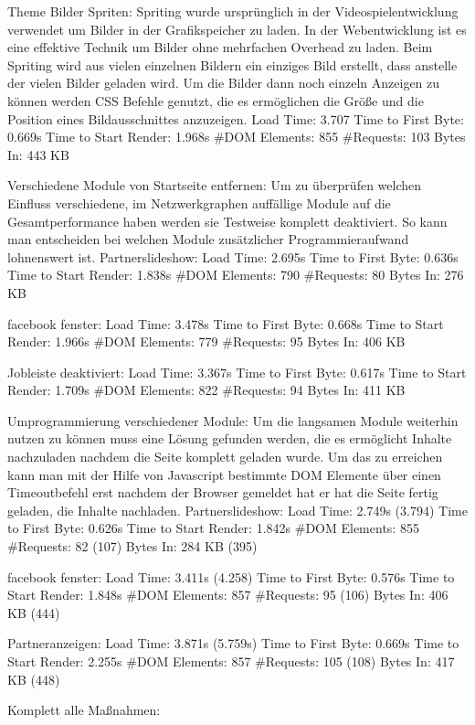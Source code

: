 Theme Bilder Spriten:
Spriting wurde ursprünglich in der Videospielentwicklung verwendet um Bilder in der Grafikspeicher zu laden. In der Webentwicklung ist es eine effektive Technik um Bilder ohne mehrfachen Overhead zu laden. Beim Spriting wird aus vielen einzelnen Bildern ein einziges Bild erstellt, dass anstelle der vielen Bilder geladen wird. Um die Bilder dann noch einzeln Anzeigen zu können werden CSS Befehle genutzt, die es ermöglichen die Größe und die Position eines Bildausschnittes anzuzeigen. 
Load Time: 3.707
Time to First Byte: 0.669s %
Time to Start Render: 1.968s
\#DOM Elements: 855 	
\#Requests: 103 
Bytes In: 443 KB 

Verschiedene Module von Startseite entfernen:
Um zu überprüfen welchen Einfluss verschiedene, im Netzwerkgraphen auffällige Module auf die Gesamtperformance haben werden sie Testweise komplett deaktiviert. So kann man entscheiden bei welchen Module zusätzlicher Programmieraufwand lohnenswert ist.
Partnerslideshow:
Load Time: 2.695s
Time to First Byte: 0.636s %
Time to Start Render: 1.838s
\#DOM Elements: 790 	
\#Requests: 80 
Bytes In: 276 KB

facebook fenster:
Load Time: 3.478s
Time to First Byte: 0.668s %
Time to Start Render: 1.966s
\#DOM Elements: 779 	
\#Requests: 95 
Bytes In: 406 KB 

Jobleiste deaktiviert:
Load Time: 3.367s
Time to First Byte: 0.617s %
Time to Start Render: 1.709s
\#DOM Elements: 822 	
\#Requests: 94 
Bytes In: 411 KB

Umprogrammierung verschiedener Module: Um die langsamen Module weiterhin nutzen zu können muss eine Lösung gefunden werden, die es ermöglicht Inhalte nachzuladen nachdem die Seite komplett geladen wurde. Um das zu erreichen kann man mit der Hilfe von Javascript bestimmte DOM Elemente über einen Timeoutbefehl erst nachdem der Browser gemeldet hat er hat die Seite fertig geladen, die Inhalte nachladen.
Partnerslideshow:
Load Time: 2.749s (3.794)
Time to First Byte: 0.626s %
Time to Start Render: 1.842s
\#DOM Elements: 855 	
\#Requests: 82 (107)
Bytes In: 284 KB (395)

facebook fenster:
Load Time: 3.411s (4.258)
Time to First Byte: 0.576s %
Time to Start Render: 1.848s
\#DOM Elements: 857
\#Requests: 95 (106)
Bytes In: 406 KB (444)

Partneranzeigen:
Load Time: 3.871s (5.759s)
Time to First Byte: 0.669s %
Time to Start Render: 2.255s
\#DOM Elements: 857 	
\#Requests: 105 (108)
Bytes In: 417 KB (448)


Komplett alle Maßnahmen:
